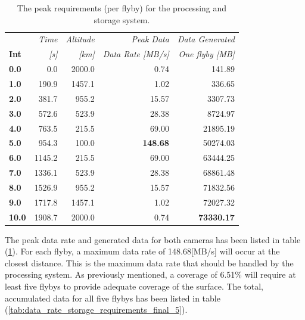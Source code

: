 \begin{table}[h!]
  \centering
    \begin{tabular}{l|r|r|r|r|}
\textbf{} & \textit{Time} & \textit{Altitude} & \textit{Peak Data} & \multicolumn{1}{r}{\textit{Data Generated}} \\
\textbf{Int} & \textit{[s]} & \textit{[km]} & \textit{Data Rate [MB/s]} & \multicolumn{1}{r}{\textit{One flyby [MB]}} \bigstrut[b]\\
\hline
\textbf{0.0} & 0.0   & 2000.0 & 0.74  & 141.89 \bigstrut[t]\\
\textbf{1.0} & 190.9 & 1457.1 & 1.02  & 336.65 \\
\textbf{2.0} & 381.7 & 955.2 & 15.57 & 3307.73 \\
\textbf{3.0} & 572.6 & 523.9 & 28.38 & 8724.97 \\
\textbf{4.0} & 763.5 & 215.5 & 69.00 & 21895.19 \\
\textbf{5.0} & 954.3 & 100.0 & \textbf{148.68} & 50274.03 \\
\textbf{6.0} & 1145.2 & 215.5 & 69.00 & 63444.25 \\
\textbf{7.0} & 1336.1 & 523.9 & 28.38 & 68861.48 \\
\textbf{8.0} & 1526.9 & 955.2 & 15.57 & 71832.56 \\
\textbf{9.0} & 1717.8 & 1457.1 & 1.02  & 72027.32 \\
\textbf{10.0} & 1908.7 & 2000.0 & 0.74  & \textbf{73330.17} \\
\end{tabular}%
        \caption{The peak requirements (per flyby) for the processing and storage system.}
  \label{tab:data_rate_storage_requirements_final}%
\end{table}%
The peak data rate and generated data for both cameras has been listed in table (\ref{tab:data_rate_storage_requirements_final}). For each flyby, a maximum data rate of 148.68[MB/s] will occur at the closest distance. This is the maximum data rate that should be handled by the processing system. 
As previously mentioned, a coverage of 6.51\% will require at least five flybys to provide adequate coverage of the surface. The total, accumulated data for all five flybys has been listed in table (\ref{tab:data_rate_storage_requirements_final_5}).
